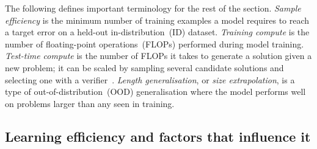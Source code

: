 The following defines important terminology for the rest of the section.
\emph{Sample efficiency} is the minimum number of training examples a model requires to reach a target error on a held-out in-distribution~(ID) dataset.
\emph{Training compute} is the number of floating-point operations~(FLOPs) performed during model training.
\emph{Test-time compute} is the number of FLOPs it takes to generate a solution given a new problem; it can be scaled by sampling several candidate solutions and selecting one with a verifier~\citep{qinBacktrackNotBacktrack2025,snellScalingLLMTestTime2024}.
\emph{Length generalisation}, or \emph{size extrapolation}, is a type of out-of-distribution~(OOD) generalisation where the model performs well on problems larger than any seen in training.

\subsection{Learning efficiency and factors that influence it}
\label{sec:bg_gap_efficiency}

